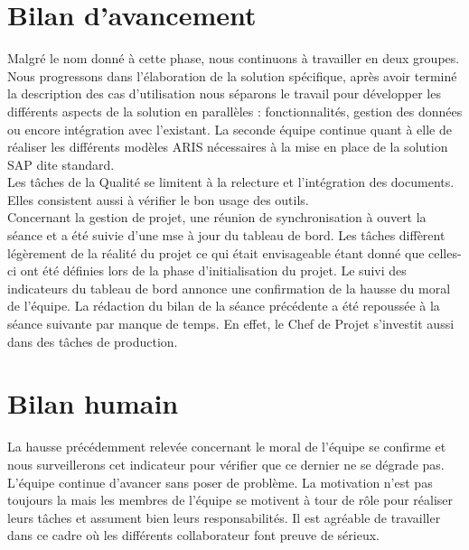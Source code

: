 
\section{Bilan d'avancement}

Malgré le nom donné à cette phase, nous continuons à travailler en deux groupes. Nous progressons dans l'élaboration de la solution spécifique, après avoir terminé la description des cas d'utilisation nous séparons le travail pour développer les différents aspects de la solution en parallèles : fonctionnalités, gestion des données ou encore intégration avec l'existant. La seconde équipe continue quant à elle de réaliser les différents modèles ARIS nécessaires à la mise en place de la solution SAP dite standard. \\

Les tâches de la Qualité se limitent à la relecture et l'intégration des documents. Elles consistent aussi à vérifier le bon usage des outils. \\

Concernant la gestion de projet, une réunion de synchronisation à ouvert la séance et a été suivie d'une mse à jour du tableau de bord. Les tâches diffèrent légèrement de la réalité du projet ce qui était envisageable étant donné que celles-ci ont été définies lors de la phase d'initialisation du projet. Le suivi des indicateurs du tableau de bord annonce une confirmation de la hausse du moral de l'équipe. La rédaction du bilan de la séance précédente a été repoussée à la séance suivante par manque de temps. En effet, le Chef de Projet s'investit aussi dans des tâches de production.

\section{Bilan humain}

La hausse précédemment relevée concernant le moral de l'équipe se confirme et nous surveillerons cet indicateur pour vérifier que ce dernier ne se dégrade pas. L'équipe continue d'avancer sans poser de problème. La motivation n'est pas toujours la mais les membres de l'équipe se motivent à tour de rôle pour réaliser leurs tâches et assument bien leurs responsabilités. Il est agréable de travailler dans ce cadre où les différents collaborateur font preuve de sérieux.  
